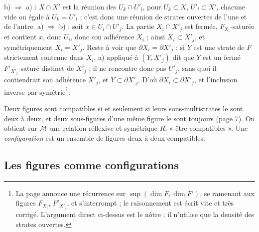 \documentclass[11pt,a4paper]{article}
\begin{document}
b) $\Rightarrow$ a) : $X \cap X'$ est la réunion des $U_{k} \cap U'_{l}$, pour
$U_{k} \subset X$, $U'_{l} \subset X'$, chacune vide ou égale à $U_{k} =
U'_{l}$ ; c'est donc une réunion de strates ouvertes de l'une et de l'autre.
a) $\Rightarrow$ b) : soit $x \in U_{i} \cap U'_{j}$. La partie $X_{i} \cap
X'_{j}$ est fermée, $F_{X_{i}}$-saturée et contient $x$, donc $U_{i}$, donc son
adhérence $X_{i}$ ; ainsi $X_{i} \subset X'_{j}$, et symétriquement $X_{i} =
X'_{j}$. Reste à voir que $\partial X_{i} = \partial X'_{j}$ : si $Y$ est une
strate de $F$ strictement contenue dans $X_{i}$, a) appliqué à $(Y, X'_{j})$
dit que $Y$ est un fermé $F'_{X'_{j}}$-saturé distinct de $X'_{j}$ ; il ne
rencontre donc pas $U'_{j}$, sans quoi il contiendrait son adhérence $X'_{j}$,
et $Y \subset \partial X'_{j}$. D'où $\partial X_{i} \subset \partial X'_{j}$,
et l'inclusion inverse par symétrie\footnote{La page annonce une récurrence sur
$\sup(\dim F, \dim F')$, se ramenant aux figures $F_{X_{i}}$, $F'_{X'_{j}}$, et
s'interrompt ; le raisonnement est écrit vite et très corrigé. L'argument
direct ci-dessus est le nôtre ; il n'utilise que la densité des strates
ouvertes.}.

Deux figures sont compatibles si et seulement si leurs sous-multistrates le
sont deux à deux, et deux sous-figures d'une même figure le sont toujours
(page 7). On obtient sur $\mathcal{M}$ une relation réflexive et symétrique
$R$, « être compatibles ». Une \emph{configuration} est un ensemble de figures
deux à deux compatibles.

\subsection*{Les figures comme configurations}
\end{document}
